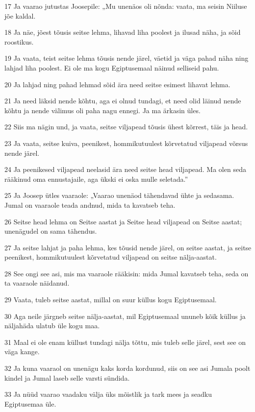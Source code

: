 \par 17 Ja vaarao jutustas Joosepile: „Mu unenäos oli nõnda: vaata, ma seisin Niiluse jõe kaldal.
\par 18 Ja näe, jõest tõusis seitse lehma, lihavad liha poolest ja ilusad näha, ja sõid roostikus.
\par 19 Ja vaata, teist seitse lehma tõusis nende järel, väetid ja väga pahad näha ning lahjad liha poolest. Ei ole ma kogu Egiptusemaal näinud selliseid pahu.
\par 20 Ja lahjad ning pahad lehmad sõid ära need seitse esimest lihavat lehma.
\par 21 Ja need läksid nende kõhtu, aga ei olnud tundagi, et need olid läinud nende kõhtu ja nende välimus oli paha nagu ennegi. Ja ma ärkasin üles.
\par 22 Siis ma nägin und, ja vaata, seitse viljapead tõusis ühest kõrrest, täis ja head.
\par 23 Ja vaata, seitse kuiva, peenikest, hommikutuulest kõrvetatud viljapead võrsus nende järel.
\par 24 Ja peenikesed viljapead neelasid ära need seitse head viljapead. Ma olen seda rääkinud oma ennustajaile, aga ükski ei oska mulle seletada.”
\par 25 Ja Joosep ütles vaaraole: „Vaarao unenäod tähendavad ühte ja sedasama. Jumal on vaaraole teada andnud, mida ta kavatseb teha.
\par 26 Seitse head lehma on Seitse aastat ja Seitse head viljapead on Seitse aastat; unenägudel on sama tähendus.
\par 27 Ja seitse lahjat ja paha lehma, kes tõusid nende järel, on seitse aastat, ja seitse peenikest, hommikutuulest kõrvetatud viljapead on seitse nälja-aastat.
\par 28 See ongi see asi, mis ma vaaraole rääkisin: mida Jumal kavatseb teha, seda on ta vaaraole näidanud.
\par 29 Vaata, tuleb seitse aastat, millal on suur küllus kogu Egiptusemaal.
\par 30 Aga neile järgneb seitse nälja-aastat, mil Egiptusemaal ununeb kõik küllus ja näljahäda ulatub üle kogu maa.
\par 31 Maal ei ole enam küllust tundagi nälja tõttu, mis tuleb selle järel, sest see on väga kange.
\par 32 Ja kuna vaaraol on unenägu kaks korda kordunud, siis on see asi Jumala poolt kindel ja Jumal laseb selle varsti sündida.
\par 33 Ja nüüd vaarao vaadaku välja üks mõistlik ja tark mees ja seadku Egiptusemaa üle.
